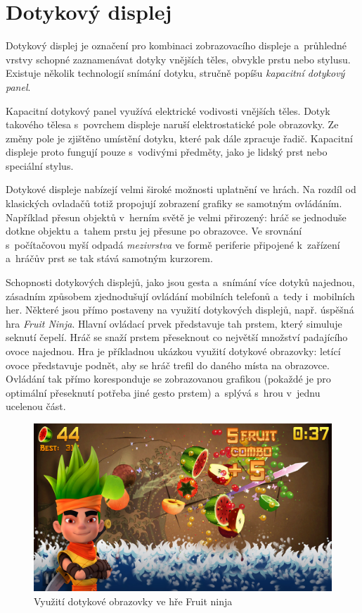 \documentclass[thesis=B,czech,hidelinks]{FITthesis}[2012/06/26] %
\begin{document}
\section{Dotykový displej}
\label{section:touchscreen}

Dotykový displej je označení pro kombinaci zobrazovacího displeje a~průhledné vrstvy schopné zaznamenávat dotyky vnějších těles, obvykle prstu nebo stylusu. Existuje několik technologií snímání dotyku, stručně popíšu \emph{kapacitní dotykový panel}.

Kapacitní dotykový panel využívá elektrické vodivosti vnějších těles. Dotyk takového tělesa s~povrchem displeje naruší elektrostatické pole obrazovky. Ze změny pole je zjištěno umístění dotyku, které pak dále zpracuje řadič. Kapacitní displeje proto fungují pouze s~vodivými předměty, jako je lidský prst nebo speciální stylus. \cite{gray2013does}

Dotykové displeje nabízejí velmi široké možnosti uplatnění ve hrách. Na rozdíl od klasických ovladačů totiž propojují zobrazení grafiky se samotným ovládáním. Například přesun objektů v~herním světě je velmi přirozený: hráč se jednoduše dotkne objektu a~tahem prstu jej přesune po obrazovce. Ve srovnání s~počítačovou myší odpadá \emph{mezivrstva} ve formě periferie připojené k~zařízení a~hráčův prst se tak stává samotným kurzorem.

Schopnosti dotykových displejů, jako jsou gesta a~snímání více dotyků najednou, zásadním způsobem zjednodušují ovládání mobilních telefonů a~tedy i~mobilních her. Některé jsou přímo postaveny na využití dotykových displejů, např. úspěšná hra \textit{Fruit Ninja}\cite{fruitninja}. Hlavní ovládací prvek představuje tah prstem, který simuluje seknutí čepelí. Hráč se snaží prstem přeseknout co největší množství padajícího ovoce najednou. Hra je příkladnou ukázkou využití dotykové obrazovky: letící ovoce představuje podnět, aby se hráč trefil do daného místa na obrazovce. Ovládání tak přímo koresponduje se zobrazovanou grafikou (pokaždé je pro optimální přeseknutí potřeba jiné gesto prstem) a~splývá s~hrou v~jednu ucelenou část.

\begin{figure}
\includegraphics[width=\textwidth]{fruit_ninja}
\caption{Využití dotykové obrazovky ve hře Fruit ninja\cite{fruitninja}}
\end{figure}
\end{document}
